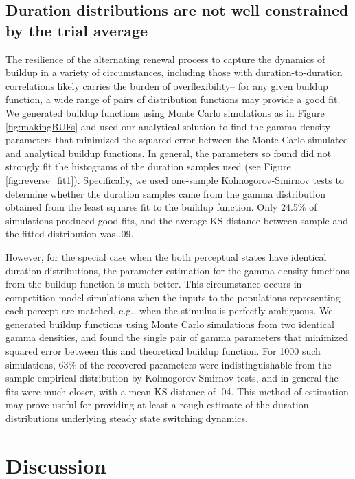 \documentclass{frontiersSCNS} %
\begin{document}
\subsection{Duration distributions are not well constrained by the trial average}

The resilience of the alternating renewal process to capture the dynamics of buildup in a variety of circumstances, including those with duration-to-duration correlations likely carries the burden of overflexibility-- for any given buildup function, a wide range of pairs of distribution functions may provide a good fit. We generated buildup functions using Monte Carlo simulations as in Figure \ref{fig:makingBUFs} and used our analytical solution to find the gamma density parameters that minimized the squared error between the Monte Carlo simulated and analytical buildup functions. In general, the parameters so found did not strongly fit the histograms of the duration samples used (see Figure \ref{fig:reverse_fit1}). %
Specifically, we used one-sample Kolmogorov-Smirnov tests to determine whether the duration samples came from the gamma distribution obtained from the least squares fit to the buildup function. Only 24.5\% of simulations produced good fits, and the average KS distance between sample and the fitted distribution was .09.

However, for the special case when the both perceptual states have identical duration distributions, the parameter estimation for the gamma density functions from the buildup function is much better. This circumstance occurs in competition model simulations when the inputs to the populations representing each percept are matched, e.g., when the stimulus is perfectly ambiguous. We generated buildup functions using Monte Carlo simulations from two identical gamma densities, and found the single pair of gamma parameters that minimized squared error between this and theoretical buildup function. For 1000 such simulations, 63\% of the recovered parameters were indistinguishable from the sample empirical distribution by Kolmogorov-Smirnov tests, and in general the fits were much closer, with a mean KS distance of .04. This method of estimation may prove useful for providing at least a rough estimate of the duration distributions underlying steady state switching dynamics.

\section{Discussion}
\end{document}

